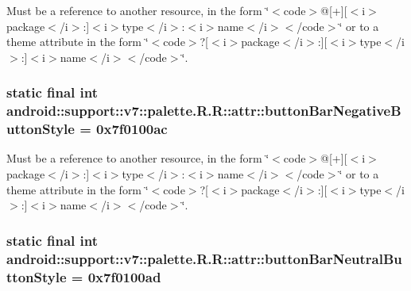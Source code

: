 Must be a reference to another resource, in the form \char`\"{}$<$code$>$@\mbox{[}+\mbox{]}\mbox{[}$<$i$>$package$<$/i$>$:\mbox{]}$<$i$>$type$<$/i$>$:$<$i$>$name$<$/i$>$$<$/code$>$\char`\"{} or to a theme attribute in the form \char`\"{}$<$code$>$?\mbox{[}$<$i$>$package$<$/i$>$:\mbox{]}\mbox{[}$<$i$>$type$<$/i$>$:\mbox{]}$<$i$>$name$<$/i$>$$<$/code$>$\char`\"{}. \hypertarget{classandroid_1_1support_1_1v7_1_1palette_1_1_r_1_1attr_67f68e2d41b10ce792c1d24cc2400ce7}{
\subsubsection[{buttonBarNegativeButtonStyle}]{\setlength{\rightskip}{0pt plus 5cm}static final int android::support::v7::palette.R.R::attr::buttonBarNegativeButtonStyle = 0x7f0100ac}}
\label{classandroid_1_1support_1_1v7_1_1palette_1_1_r_1_1attr_67f68e2d41b10ce792c1d24cc2400ce7}


Must be a reference to another resource, in the form \char`\"{}$<$code$>$@\mbox{[}+\mbox{]}\mbox{[}$<$i$>$package$<$/i$>$:\mbox{]}$<$i$>$type$<$/i$>$:$<$i$>$name$<$/i$>$$<$/code$>$\char`\"{} or to a theme attribute in the form \char`\"{}$<$code$>$?\mbox{[}$<$i$>$package$<$/i$>$:\mbox{]}\mbox{[}$<$i$>$type$<$/i$>$:\mbox{]}$<$i$>$name$<$/i$>$$<$/code$>$\char`\"{}. \hypertarget{classandroid_1_1support_1_1v7_1_1palette_1_1_r_1_1attr_87bdf14383eabd8bc96469a004846080}{
\subsubsection[{buttonBarNeutralButtonStyle}]{\setlength{\rightskip}{0pt plus 5cm}static final int android::support::v7::palette.R.R::attr::buttonBarNeutralButtonStyle = 0x7f0100ad}}
\label{classandroid_1_1support_1_1v7_1_1palette_1_1_r_1_1attr_87bdf14383eabd8bc96469a004846080}


